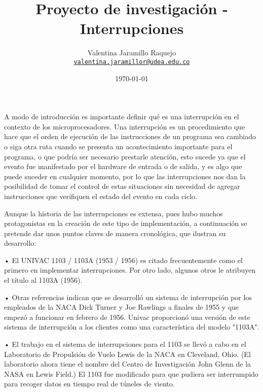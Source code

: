 \documentclass[12pt]{article}
\title{Proyecto de investigación - Interrupciones
}
\author{Valentina Jaramillo Raquejo\\%
    \href{mailto:valentina.jaramillor@udea.edu.co}{\texttt{valentina.jaramillor@udea.edu.co}} %
    }
\date{\today}
\begin{document}
{
\maketitle


A modo de introducción es importante definir qué es una interrupción en el contexto de los microprocesadores. Una interrupción es un procedimiento que hace que el orden de ejecución de las instrucciones de un programa sea cambiado o siga otra ruta cuando se presenta un acontecimiento importante para el programa, o que podría ser necesario prestarle atención, esto sucede ya que el evento fue manifestado por el hardware de entrada o de salida, y es algo que puede suceder en cualquier momento, por lo que las interrupciones nos dan la posibilidad de tomar el control de estas situaciones sin necesidad de agregar instrucciones que verifiquen el estado del evento en cada ciclo.\citep{LambdaEcu}
\newline

Aunque la historia de las interrupciones es extensa, pues hubo muchos protagonistas en la creación de este tipo de implementación, a continuación se pretende dar unos puntos claves de manera cronológica, que ilustran su desarrollo:
\newline

•	El UNIVAC 1103 / 1103A (1953 / 1956) es citado frecuentemente como el primero en implementar interrupciones. Por otro lado, algunos otros le atribuyen el título al 1103A (1956).

•	Otras referencias indican que se desarrolló un sistema de interrupción por los empleados de la NACA Dick Turner y Joe Rawlings a finales de 1955 y que empezó a funcionar en febrero de 1956. Univac proporcionó una versión de este sistema de interrupción a los clientes como una característica del modelo "1103A".

•	El trabajo en el sistema de interrupciones para el 1103 se llevó a cabo en el Laboratorio de Propulsión de Vuelo Lewis de la NACA en Cleveland, Ohio. (El laboratorio ahora tiene el nombre del Centro de Investigación John Glenn de la NASA en Lewis Field.) El 1103 fue modificado para que pudiera ser interrumpido para recoger datos en tiempo real de túneles de viento.

}
\end{document}
